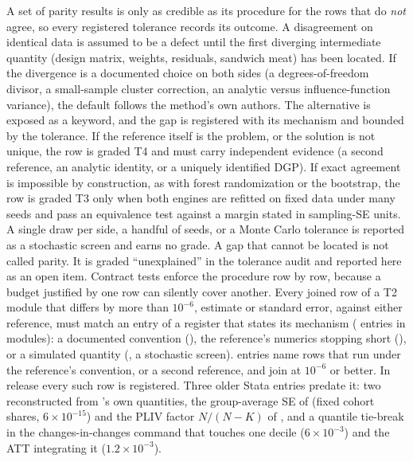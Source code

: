 A set of parity results is only as credible as its procedure for the rows
that do \emph{not} agree, so every registered tolerance records its outcome. A disagreement on
identical data is assumed to be a \statspai{} defect until the first
diverging intermediate quantity (design matrix, weights, residuals,
sandwich meat) has been located. If the divergence is a documented
choice on both sides (a degrees-of-freedom divisor, a small-sample
cluster correction, an analytic versus influence-function variance),
the default follows the method's own authors. The alternative is exposed as a keyword,
and the gap is registered with its mechanism and bounded by the
tolerance. If the reference itself is the problem, or the solution is
not unique, the row is graded T4 and must carry independent evidence (a
second reference, an analytic identity, or a uniquely identified DGP). If exact agreement is impossible by
construction, as with forest randomization or the bootstrap, the row is
graded T3 only when both engines are refitted on fixed data under many
seeds and pass an equivalence test against a margin stated in
sampling-SE units. A single draw per side, a handful of seeds, or a
Monte Carlo tolerance is reported as a stochastic screen and earns no
grade. A gap that cannot be located is not called parity. It is graded
``unexplained'' in the tolerance audit and reported here as an open
item.
Contract tests enforce the procedure row by row, because a budget
justified by one row can silently cover another. Every joined row of a
T2 module that differs by more than \(10^{-6}\), estimate or standard
error, against either reference, must match an entry of a register that
states its mechanism (\RowGapEntryCount{} entries in
\RowGapModuleCount{} modules): a documented convention
(\RowGapConventionCount{}), the reference's numerics stopping short
(\RowGapNumericsCount{}), or a simulated quantity
(\RowGapStochasticCount{}, a stochastic screen). \RowGapPinnedCount{}
entries name rows that run \statspai{} under the reference's convention,
or a second reference, and join at \(10^{-6}\) or better. In release
\StatsPAIVersion{} every such row is registered. Three older Stata entries
predate it: two reconstructed from \statspai{}'s own quantities, the
group-average SE of  (fixed cohort shares,
\(6\times10^{-15}\)) and the PLIV factor \(N/(N-K)\) of
 \citep{ahrens2024ddml}, and a quantile tie-break
in the changes-in-changes command  that touches one decile
(\(6\times10^{-3}\)) and the ATT integrating it (\(1.2\times10^{-3}\)).

